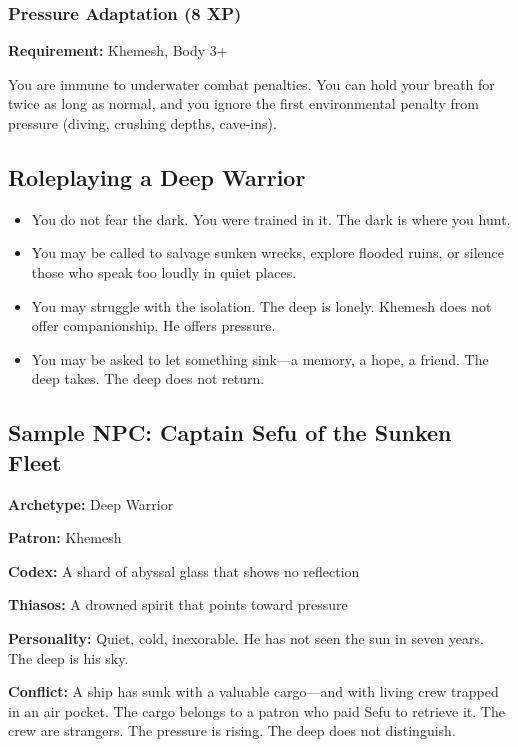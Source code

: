 \subsubsection{Pressure Adaptation (8 XP)}

\textbf{Requirement:} Khemesh, Body 3+

You are immune to underwater combat penalties. You can hold your breath for twice as long as normal, and you ignore the first environmental penalty from pressure (diving, crushing depths, cave-ins).

\subsection{Roleplaying a Deep Warrior}

\begin{itemize}
\item You do not fear the dark. You were trained in it. The dark is where you hunt.
\item You may be called to salvage sunken wrecks, explore flooded ruins, or silence those who speak too loudly in quiet places.
\item You may struggle with the isolation. The deep is lonely. Khemesh does not offer companionship. He offers pressure.
\item You may be asked to let something sink—a memory, a hope, a friend. The deep takes. The deep does not return.
\end{itemize}

\subsection{Sample NPC: Captain Sefu of the Sunken Fleet}

\textbf{Archetype:} Deep Warrior

\textbf{Patron:} Khemesh

\textbf{Codex:} A shard of abyssal glass that shows no reflection

\textbf{Thiasos:} A drowned spirit that points toward pressure

\textbf{Personality:} Quiet, cold, inexorable. He has not seen the sun in seven years. The deep is his sky.

\textbf{Conflict:} A ship has sunk with a valuable cargo—and with living crew trapped in an air pocket. The cargo belongs to a patron who paid Sefu to retrieve it. The crew are strangers. The pressure is rising. The deep does not distinguish.

